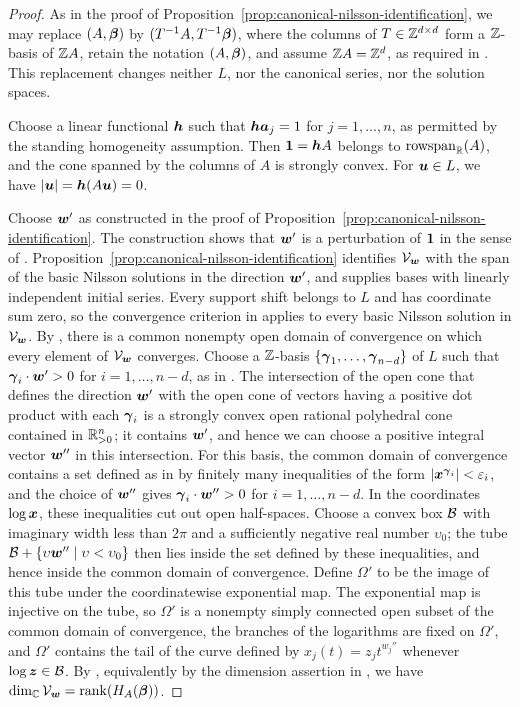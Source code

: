 \begin{proof}
	As in the proof of Proposition~\ref{prop:canonical-nilsson-identification}, we may replace \((A,\boldsymbol{\beta})\) by \((T^{-1}A,T^{-1}\boldsymbol{\beta})\), where the columns of \(T\in\mathbb Z^{d\times d}\) form a \(\mathbb Z\)-basis of \(\mathbb Z A\), retain the notation \((A,\boldsymbol{\beta})\), and assume \(\mathbb Z A=\mathbb Z^d\), as required in \cite{DMM12}.
	This replacement changes neither \(L\), nor the canonical series, nor the solution spaces.

	Choose a linear functional \(\boldsymbol{h}\) such that \(\boldsymbol{h}\boldsymbol{a}_j=1\) for \(j=1,\ldots,n\), as permitted by the standing homogeneity assumption.
	Then \(\boldsymbol{1}=\boldsymbol{h} A\) belongs to \(\operatorname{rowspan}_{\mathbb R}(A)\), and the cone spanned by the columns of \(A\) is strongly convex.
	For \(\boldsymbol{u}\in L\), we have \(|\boldsymbol{u}| = \boldsymbol{h}(A\boldsymbol{u}) =0\).

	Choose \(\boldsymbol{w}'\) as constructed in the proof of Proposition~\ref{prop:canonical-nilsson-identification}.
	The construction shows that \(\boldsymbol{w}'\) is a perturbation of \(\boldsymbol{1}\) in the sense of \cite[Definition~3.3]{DMM12}.
	Proposition~\ref{prop:canonical-nilsson-identification} identifies \(\mathcal V_{\boldsymbol{w}}\) with the span of the basic Nilsson solutions in the direction \(\boldsymbol{w}'\), and \cite[Lemma~2.8]{DMM12} supplies bases with linearly independent initial series.
	Every support shift belongs to \(L\) and has coordinate sum zero, so the convergence criterion in \cite[Theorem~6.2]{DMM12} applies to every basic Nilsson solution in \(\mathcal V_{\boldsymbol{w}}\).
	By \cite[Theorem~6.4]{DMM12}, there is a common nonempty open domain of convergence on which every element of \(\mathcal V_{\boldsymbol{w}}\) converges.
	Choose a \(\mathbb Z\)-basis \(\{\boldsymbol{\gamma}_1,\ldots,\boldsymbol{\gamma}_{n-d}\}\) of \(L\) such that \(\boldsymbol{\gamma}_i\cdot\boldsymbol{w}'>0\) for \(i=1,\ldots,n-d\), as in \cite[Notation~6.1]{DMM12}.
	The intersection of the open cone that defines the direction \(\boldsymbol{w}'\) with the open cone of vectors having a positive dot product with each \(\boldsymbol{\gamma}_i\) is a strongly convex open rational polyhedral cone contained in \(\mathbb R_{>0}^n\); it contains \(\boldsymbol{w}'\), and hence we can choose a positive integral vector \(\boldsymbol{w}''\) in this intersection.
	For this basis, the common domain of convergence contains a set defined as in \cite[Notation~6.1]{DMM12} by finitely many inequalities of the form \(|\boldsymbol{x}^{\boldsymbol{\gamma}_i}|<\varepsilon_i\), and the choice of \(\boldsymbol{w}''\) gives \(\boldsymbol{\gamma}_i\cdot\boldsymbol{w}''>0\) for \(i=1,\ldots,n-d\).
	In the coordinates \(\log\boldsymbol{x}\), these inequalities cut out open half-spaces.
	Choose a convex box \(\mathcal B\) with imaginary width less than \(2\pi\) and a sufficiently negative real number \(\upsilon_0\); the tube \(\mathcal B+\{\upsilon\boldsymbol{w}''\mid \upsilon<\upsilon_0\}\) then lies inside the set defined by these inequalities, and hence inside the common domain of convergence.
	Define \(\Omega'\) to be the image of this tube under the coordinatewise exponential map.
	The exponential map is injective on the tube, so \(\Omega'\) is a nonempty simply connected open subset of the common domain of convergence, the branches of the logarithms are fixed on \(\Omega'\), and \(\Omega'\) contains the tail of the curve defined by \(x_j(t)=z_jt^{w_j''}\) whenever \(\log\boldsymbol{z}\in\mathcal B\).
	By \cite[Corollary~2.4.16]{SST00}, equivalently by the dimension assertion in \cite[Theorem~6.4]{DMM12}, we have \(\dim_{\mathbb C}\mathcal V_{\boldsymbol{w}}=\operatorname{rank}(H_A(\boldsymbol{\beta}))\).


\end{proof}
